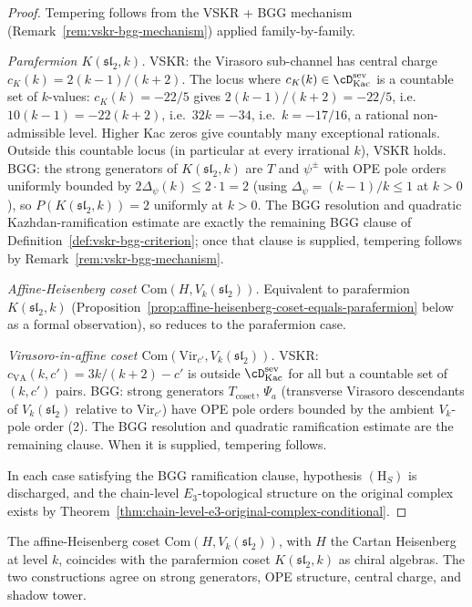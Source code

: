 \begin{proof}
Tempering follows from the VSKR + BGG mechanism
(Remark~\ref{rem:vskr-bgg-mechanism}) applied family-by-family.

\emph{Parafermion $K(\mathfrak{sl}_2, k)$.} VSKR: the Virasoro
sub-channel has central charge $c_K(k) = 2(k - 1) / (k + 2)$. The
locus where $c_K(k) \in \cD^{\mathrm{sev}}_{\mathrm{Kac}}$ is a
countable set of $k$-values: $c_K(k) = -22/5$ gives
$2(k - 1)/(k + 2) = -22/5$, i.e.\ $10(k - 1) = -22(k + 2)$, i.e.\
$32 k = -34$, i.e.\ $k = -17/16$, a rational non-admissible
level. Higher Kac zeros give countably many exceptional rationals.
Outside this countable locus (in particular at every irrational $k$),
VSKR holds. BGG: the strong generators of $K(\mathfrak{sl}_2, k)$
are $T$ and $\psi^\pm$ with OPE pole orders uniformly bounded by
$2 \Delta_\psi(k) \le 2 \cdot 1 = 2$ (using
$\Delta_\psi = (k - 1)/k \le 1$ at $k > 0$), so
$P(K(\mathfrak{sl}_2, k)) = 2$ uniformly at $k > 0$. The BGG
resolution and quadratic Kazhdan-ramification estimate are exactly the
remaining BGG clause of Definition~\ref{def:vskr-bgg-criterion}; once
that clause is supplied, tempering follows by
Remark~\ref{rem:vskr-bgg-mechanism}.

\emph{Affine-Heisenberg coset
$\mathrm{Com}(H, V_k(\mathfrak{sl}_2))$.} Equivalent to parafermion
$K(\mathfrak{sl}_2, k)$
(Proposition~\ref{prop:affine-heisenberg-coset-equals-parafermion}
below as a formal observation), so reduces to the parafermion case.

\emph{Virasoro-in-affine coset
$\mathrm{Com}(\mathrm{Vir}_{c'}, V_k(\mathfrak{sl}_2))$.} VSKR:
$c_{\mathrm{VA}}(k, c') = 3 k / (k + 2) - c'$ is outside
$\cD^{\mathrm{sev}}_{\mathrm{Kac}}$ for all but a countable set of
$(k, c')$ pairs. BGG: strong generators $T_{\mathrm{coset}}$,
$\Psi_a$ (transverse Virasoro descendants of $V_k(\mathfrak{sl}_2)$
relative to $\mathrm{Vir}_{c'}$) have OPE pole orders bounded by the
ambient $V_k$-pole order (2). The BGG resolution and quadratic
ramification estimate are the remaining clause. When it is supplied,
tempering follows.

In each case satisfying the BGG ramification clause, hypothesis
$(\mathrm{H}_S)$ is discharged, and the chain-level
$E_3$-topological structure on the original complex exists by
Theorem~\ref{thm:chain-level-e3-original-complex-conditional}.
\end{proof}

\begin{proposition}
\label{prop:affine-heisenberg-coset-equals-parafermion}
\ClaimStatusProvedHere
The affine-Heisenberg coset
$\mathrm{Com}(H, V_k(\mathfrak{sl}_2))$, with $H$ the Cartan
Heisenberg at level $k$, coincides with the parafermion coset
$K(\mathfrak{sl}_2, k)$ as chiral algebras. The two constructions
agree on strong generators, OPE structure, central charge, and
shadow tower.
\end{proposition}

